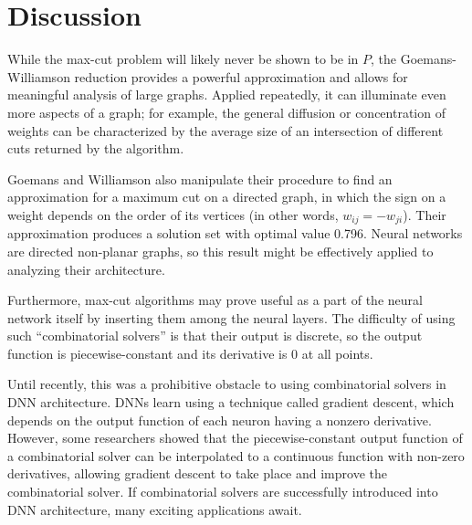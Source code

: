 
\section{Discussion}

\par While the max-cut problem will likely never be shown to be in $P$, the Goemans-Williamson reduction provides a powerful approximation and allows for meaningful analysis of large graphs. Applied repeatedly, it can illuminate even more aspects of a graph; for example, the general diffusion or concentration of weights can be characterized by the average size of an intersection of different cuts returned by the algorithm.\cite{GW} \\

\par Goemans and Williamson also manipulate their procedure to find an approximation for a maximum cut on a directed graph, in which the sign on a weight depends on the order of its vertices (in other words, $w_{ij} = -w_{ji}$). Their approximation produces a solution set with optimal value 0.796. Neural networks are directed non-planar graphs, so this result might be effectively applied to analyzing their architecture. \\

\par Furthermore, max-cut algorithms may prove useful as a part of the neural network itself by inserting them among the neural layers. The difficulty of using such ``combinatorial solvers'' is that their output is discrete, so the output function is piecewise-constant and its derivative is 0 at all points. \\

\par Until recently, this was a prohibitive obstacle to using combinatorial solvers in DNN architecture. DNNs learn using a technique called gradient descent, which depends on the output function of each neuron having a nonzero derivative. However, some researchers showed that the piecewise-constant output function of a combinatorial solver can be interpolated to a continuous function with non-zero derivatives, allowing gradient descent to take place and improve the combinatorial solver.\cite{Vlast} If combinatorial solvers are successfully introduced into DNN architecture, many exciting applications await. 